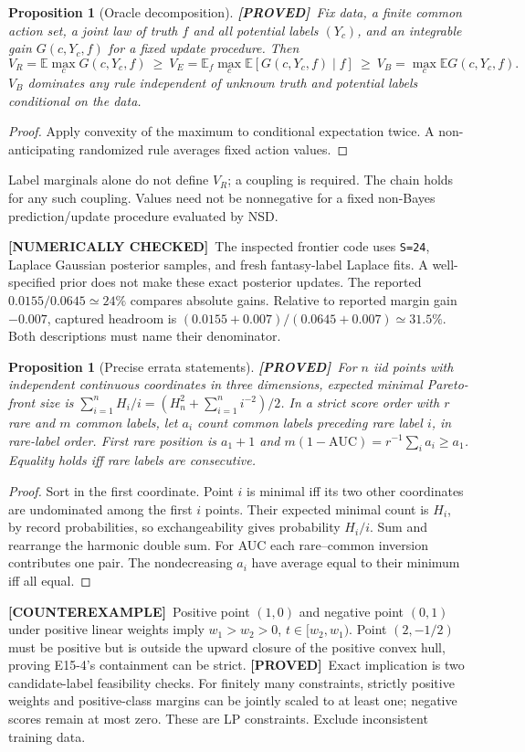 \documentclass[11pt]{article}
\newtheorem{proposition}[theorem]{Proposition}
\theoremstyle{definition}
\newcommand{\E}{\mathbb E}
\newcommand{\1}{\mathbf 1}
\newcommand{\pr}{\textbf{[PROVED]}}
\newcommand{\ce}{\textbf{[COUNTEREXAMPLE]}}
\newcommand{\nc}{\textbf{[NUMERICALLY CHECKED]}}
\begin{document}
\begin{proposition}[Oracle decomposition]\label{prop:oracle}
\pr\ Fix data, a finite common action set, a joint law of truth $f$ and all
potential labels $(Y_c)$, and an integrable gain $G(c,Y_c,f)$ for a fixed
update procedure. Then
\[
 V_R=\E\max_cG(c,Y_c,f)\ \ge\
 V_E=\E_f\max_c\E[G(c,Y_c,f)\mid f]\ \ge\
 V_B=\max_c\E G(c,Y_c,f).
\]
$V_B$ dominates any rule independent of unknown truth and potential labels
conditional on the data.
\end{proposition}
\begin{proof}
Apply convexity of the maximum to conditional expectation twice.
A non-anticipating randomized rule averages fixed action values.
\end{proof}
Label marginals alone do not define $V_R$; a coupling is required.
The chain holds for any such coupling. Values need not be nonnegative for
a fixed non-Bayes prediction/update procedure evaluated by NSD.

\nc\ The inspected frontier code uses \texttt{S=24}, Laplace Gaussian
posterior samples, and fresh fantasy-label Laplace fits. A well-specified
prior does not make these exact posterior updates.
The reported $0.0155/0.0645\simeq24\%$ compares absolute gains.
Relative to reported margin gain $-0.007$, captured headroom is
$(0.0155+0.007)/(0.0645+0.007)\simeq31.5\%$.
Both descriptions must name their denominator.

\begin{proposition}[Precise errata statements]\label{prop:errata}
\pr\ For $n$ iid points with independent continuous coordinates in three
dimensions, expected minimal Pareto-front size is
$\sum_{i=1}^n H_i/i=(H_n^2+\sum_{i=1}^ni^{-2})/2$.
In a strict score order with $r$ rare and $m$ common labels, let $a_i$
count common labels preceding rare label $i$, in rare-label order.
First rare position is $a_1+1$ and
$m(1-\mathrm{AUC})=r^{-1}\sum_i a_i\ge a_1$.
Equality holds iff rare labels are consecutive.
\end{proposition}
\begin{proof}
Sort in the first coordinate. Point $i$ is minimal iff its two other
coordinates are undominated among the first $i$ points. Their expected
minimal count is $H_i$, by record probabilities, so exchangeability gives
probability $H_i/i$. Sum and rearrange the harmonic double sum.
For AUC each rare--common inversion contributes one pair.
The nondecreasing $a_i$ have average equal to their minimum iff all equal.
\end{proof}
\ce\ Positive point $(1,0)$ and negative point $(0,1)$ under positive
linear weights imply $w_1>w_2>0$, $t\in[w_2,w_1)$.
Point $(2,-1/2)$ must be positive but is outside the upward closure of
the positive convex hull, proving E15-4's containment can be strict.
\pr\ Exact implication is two candidate-label feasibility checks.
For finitely many constraints, strictly positive weights and positive-class
margins can be jointly scaled to at least one; negative scores remain
at most zero. These are LP constraints. Exclude inconsistent training data.
\end{document}
